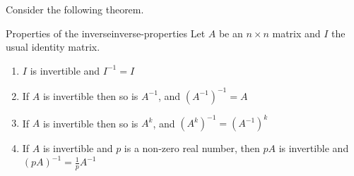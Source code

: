 Consider the following theorem.

\begin{theorem}{Properties of the inverse}{inverse-properties}
  Let $A$ be an $n \times n$ matrix and $I$ the usual identity matrix. 
  \begin{enumerate}
  \item
    $I$ is invertible and $I^{-1} = I$
  \item
    If $A$ is invertible then so is $A^{-1}$, and $(A^{-1})^{-1} = A$
  \item
    If $A$ is invertible then so is $A^k$, and $(A^k)^{-1} = (A^{-1})^k$
  \item
    If $A$ is invertible and $p$ is a non-zero real number, then $pA$ is invertible and $(pA)^{-1} = \frac{1}{p}A^{-1}$
  \end{enumerate}
\end{theorem}
